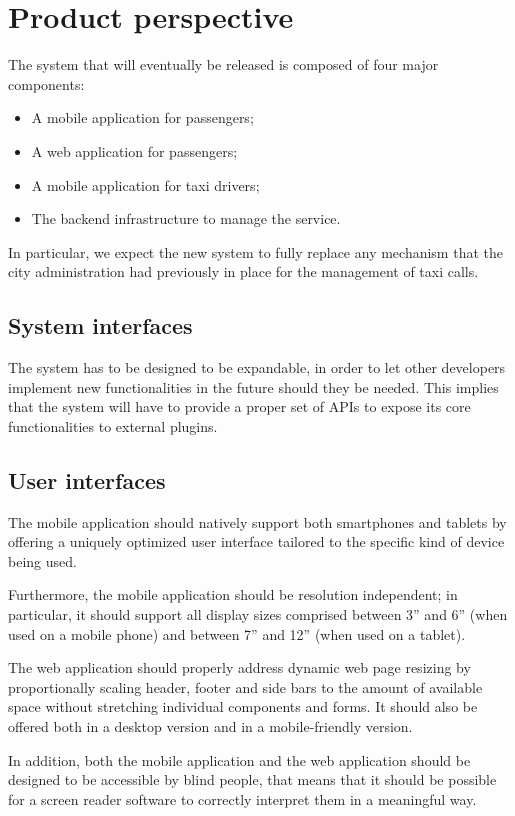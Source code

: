 \section{Product perspective}
The system that will eventually be released is composed of four major components:
\begin{itemize}
\item A mobile application for passengers;
\item A web application for passengers;
\item A mobile application for taxi drivers;
\item The backend infrastructure to manage the service.
\end{itemize}
In particular, we expect the new system to fully replace any mechanism that the city administration had previously in place for the management of taxi calls.


\subsection{System interfaces}
The system has to be designed to be expandable, in order to let other developers implement new functionalities in the future should they be needed. This implies that the system will have to provide a proper set of APIs to expose its core functionalities to external plugins. 


\subsection{User interfaces}
The mobile application should natively support both smartphones and tablets by offering a uniquely optimized user interface tailored to the specific kind of device being used. 

Furthermore, the mobile application should be resolution independent; in particular, it should support all display sizes comprised between 3” and 6” (when used on a mobile phone) and between 7” and 12” (when used on a tablet).

The web application should properly address dynamic web page resizing by proportionally scaling header, footer and side bars to the amount of available space without stretching individual components and forms. It should also be offered both in a desktop version and in a mobile-friendly version.

In addition, both the mobile application and the web application should be designed to be accessible by blind people, that means that it should be possible for a screen reader software to correctly interpret them in a meaningful way.


